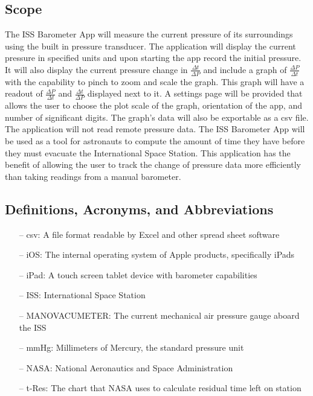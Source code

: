 \documentclass[onecolumn, draftclsnofoot,10pt, compsoc]{IEEEtran}
\def \CapstoneProjectName{ISS Barometer App }
\begin{document}
\subsection{Scope}
The \CapstoneProjectName will measure the current pressure of its surroundings using the built in pressure transducer.
The application will display the current pressure in specified units and upon starting the app record the initial pressure.
It will also display the current pressure change in $\frac{\Delta t}{\Delta P}$ and include a graph of $\frac{\Delta P}{\Delta t}$ with the capability to pinch to zoom and scale the graph.
This graph will have a readout of $\frac{\Delta P}{\Delta t}$ and $\frac{\Delta t}{\Delta P}$ displayed next to it.
A settings page will be provided that allows the user to choose the plot scale of the graph, orientation of the app, and number of significant digits.
The graph's data will also be exportable as a csv file.
The application will not read remote pressure data.
The \CapstoneProjectName will be used as a tool for astronauts to compute the amount of time they have before they must evacuate the International Space Station.
This application has the benefit of allowing the user to track the change of pressure data more efficiently than taking readings from a manual barometer.

\subsection{Definitions, Acronyms, and Abbreviations}
\begin{itemize}
\item[--] csv: A file format readable by Excel and other spread sheet software
\item[--] iOS: The internal operating system of Apple products, specifically iPads
\item[--] iPad: A touch screen tablet device with barometer capabilities
\item[--] ISS: International Space Station
\item[--] MANOVACUMETER: The current mechanical air pressure gauge aboard the ISS
\item[--] mmHg: Millimeters of Mercury, the standard pressure unit
\item[--] NASA: National Aeronautics and Space Administration
\item[--] t-Res: The chart that NASA uses to calculate residual time left on station
\end{itemize}
\end{document}
